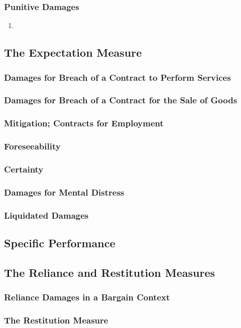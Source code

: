 \subsubsection{Punitive Damages}

\begin{enumerate}
    \item %
\end{enumerate}

\subsection{The Expectation Measure}

\subsubsection{Damages for Breach of a Contract to Perform Services}


\subsubsection{Damages for Breach of a Contract for the Sale of Goods}


\subsubsection{Mitigation; Contracts for Employment}

\subsubsection{Foreseeability}

\subsubsection{Certainty}

\subsubsection{Damages for Mental Distress}

\subsubsection{Liquidated Damages}

\subsection{Specific Performance}

\subsection{The Reliance and Restitution Measures}

\subsubsection{Reliance Damages in a Bargain Context}

\subsubsection{The Restitution Measure}


